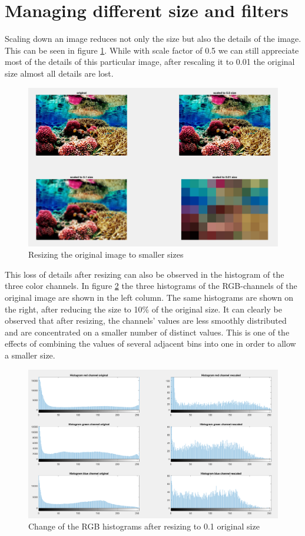 \section{Managing different size and filters}

Scaling down an image reduces not only the size but also the details of the image. This can be seen in figure \ref{fig:task5}. While with scale factor of 0.5 we can still appreciate most of the details of this particular image, after rescaling it to 0.01 the original size almost all details are lost.

\begin{figure}[!hbt]
  \includegraphics[width=\textwidth]{./img/task5.png}
  \caption{Resizing the original image to smaller sizes}
  \label{fig:task5}
\end{figure}

This loss of details after resizing can also be observed in the histogram of the three color channels. In figure \ref{fig:task6} the three histograms of the RGB-channels of the original image are shown in the left column. The same histograms are shown on the right, after reducing the size to 10\% of the original size. It can clearly be observed that after resizing, the channels' values are less smoothly distributed and are concentrated on a smaller number of distinct values. This is one of the effects of combining the values of several adjacent bins into one in order to allow a smaller size. 

\begin{figure}[!hbt]
  \includegraphics[width=\textwidth]{./img/task6.png}
  \caption{Change of the RGB histograms after resizing to 0.1 original size}
  \label{fig:task6}
\end{figure}

